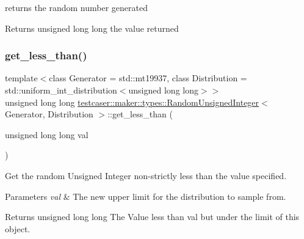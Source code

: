 returns the random number generated 

\begin{DoxyReturn}{Returns}
unsigned long long the value returned 
\end{DoxyReturn}
\mbox{\label{classtestcaser_1_1maker_1_1types_1_1RandomUnsignedInteger_aa13e775f49786618884633ce67aa5d32}} 
\subsubsection{\texorpdfstring{get\_less\_than()}{get\_less\_than()}}
{\footnotesize\ttfamily template$<$class Generator = std\+::mt19937, class Distribution = std\+::uniform\+\_\+int\+\_\+distribution$<$unsigned long long$>$$>$ \\
unsigned long long \mbox{\hyperlink{classtestcaser_1_1maker_1_1types_1_1RandomUnsignedInteger}{testcaser\+::maker\+::types\+::\+Random\+Unsigned\+Integer}}$<$ Generator, Distribution $>$\+::get\+\_\+less\+\_\+than (\begin{DoxyParamCaption}\item[{unsigned long long}]{val }\end{DoxyParamCaption})\hspace{0.3cm}{\ttfamily [inline]}}



Get the random Unsigned Integer non-\/strictly less than the value specified. 


\begin{DoxyParams}{Parameters}
{\em val} & The new upper limit for the distribution to sample from. \\
\hline
\end{DoxyParams}
\begin{DoxyReturn}{Returns}
unsigned long long The Value less than val but under the limit of this object. 
\end{DoxyReturn}
\mbox{\label{classtestcaser_1_1maker_1_1types_1_1RandomUnsignedInteger_a04d02042b14bec27cbff6bbd4aeb1186}} 
